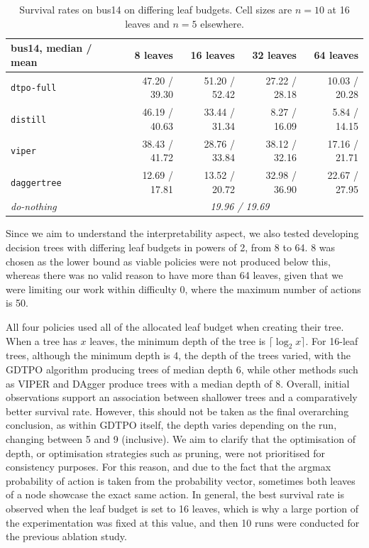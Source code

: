 \begin{table}[H]
\centering
\small
\begin{tabular}{lrrrr}
\toprule
bus14, median / mean & 8 leaves & 16 leaves & 32 leaves & 64 leaves \\
\midrule
\texttt{dtpo-full} & 47.20 / 39.30 & 51.20 / 52.42 & 27.22 / 28.18 & 10.03 / 20.28 \\
\texttt{distill} & 46.19 / 40.63 & 33.44 / 31.34 & 8.27 / 16.09 & 5.84 / 14.15 \\
\texttt{viper} & 38.43 / 41.72 & 28.76 / 33.84 & 38.12 / 32.16 & 17.16 / 21.71 \\
\texttt{daggertree} & 12.69 / 17.81 & 13.52 / 20.72 & 32.98 / 36.90 & 22.67 / 27.95 \\
\midrule
\textit{do-nothing} & \multicolumn{4}{c}{\textit{19.96 / 19.69}} \\
\bottomrule
\end{tabular}
\caption{Survival rates on bus14 on differing leaf budgets. Cell sizes are $n=10$ at 16 leaves and $n=5$ elsewhere.}
\label{tab:frontier}
\end{table}

Since we aim to understand the interpretability aspect, we also tested developing decision trees with differing leaf budgets in powers of 2, from 8 to 64. 8 was chosen as the lower bound as viable policies were not produced below this, whereas there was no valid reason to have more than 64 leaves, given that we were limiting our work within difficulty 0, where the maximum number of actions is 50. 

All four policies used all of the allocated leaf budget when creating their tree. When a tree has $x$ leaves, the minimum depth of the tree is $\lceil\log_2 x\rceil$. For 16-leaf trees, although the minimum depth is 4, the depth of the trees varied, with the GDTPO algorithm producing trees of median depth 6, while other methods such as VIPER and DAgger produce trees with a median depth of 8. Overall, initial observations support an association between shallower trees and a comparatively better survival rate. However, this should not be taken as the final overarching conclusion, as within GDTPO itself, the depth varies depending on the run, changing between 5 and 9 (inclusive). We aim to clarify that the optimisation of depth, or optimisation strategies such as pruning, were not prioritised for consistency purposes. For this reason, and due to the fact that the argmax probability of action is taken from the probability vector, sometimes both leaves of a node showcase the exact same action. In general, the best survival rate is observed when the leaf budget is set to 16 leaves, which is why a large portion of the experimentation was fixed at this value, and then 10 runs were conducted for the previous ablation study. 

